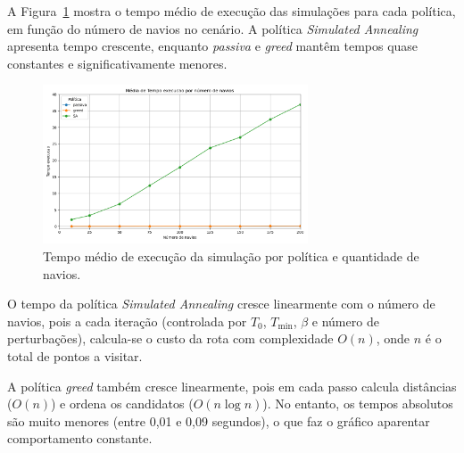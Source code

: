 A Figura~\ref{fig:tempo_execucao} mostra o tempo médio de execução das simulações para cada política, em função do número de navios no cenário. A política \textit{Simulated Annealing} apresenta tempo crescente, enquanto \textit{passiva} e \textit{greed} mantêm tempos quase constantes e significativamente menores.

\begin{figure}[H]
    \centering
    \includegraphics[width=0.7\textwidth]{fig/resultado_tem.png}
    \caption{Tempo médio de execução da simulação por política e quantidade de navios.}
    \label{fig:tempo_execucao}
\end{figure}

O tempo da política \textit{Simulated Annealing} cresce linearmente com o número de navios, pois a cada iteração (controlada por $T_0$, $T_{\text{min}}$, $\beta$ e número de perturbações), calcula-se o custo da rota com complexidade $O(n)$, onde $n$ é o total de pontos a visitar.

A política \textit{greed} também cresce linearmente, pois em cada passo calcula distâncias ($O(n)$) e ordena os candidatos ($O(n \log n)$). No entanto, os tempos absolutos são muito menores (entre 0{,}01 e 0{,}09 segundos), o que faz o gráfico aparentar comportamento constante.



